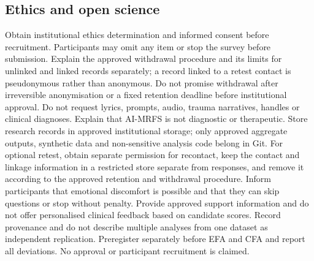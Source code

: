 \subsection{Ethics and open science}
Obtain institutional ethics determination and informed consent before recruitment. Participants may omit any item or stop the survey before submission. Explain the approved withdrawal procedure and its limits for unlinked and linked records separately; a record linked to a retest contact is pseudonymous rather than anonymous. Do not promise withdrawal after irreversible anonymisation or a fixed retention deadline before institutional approval. Do not request lyrics, prompts, audio, trauma narratives, handles or clinical diagnoses. Explain that AI-MRFS is not diagnostic or therapeutic. Store research records in approved institutional storage; only approved aggregate outputs, synthetic data and non-sensitive analysis code belong in Git. For optional retest, obtain separate permission for recontact, keep the contact and linkage information in a restricted store separate from responses, and remove it according to the approved retention and withdrawal procedure. Inform participants that emotional discomfort is possible and that they can skip questions or stop without penalty. Provide approved support information and do not offer personalised clinical feedback based on candidate scores. Record provenance and do not describe multiple analyses from one dataset as independent replication. Preregister separately before EFA and CFA and report all deviations. No approval or participant recruitment is claimed.
